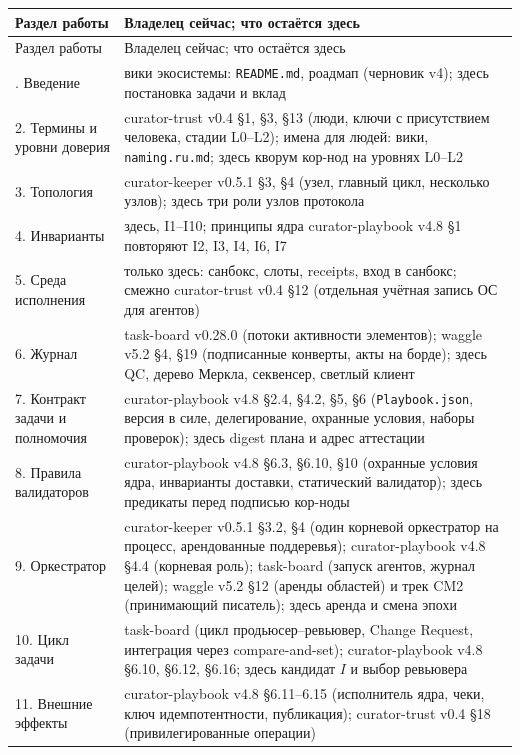 \documentclass[11pt,a4paper]{article}
\begin{document}
{\footnotesize
\begin{longtable}{p{3.4cm} p{10.0cm}}
\toprule
Раздел работы & Владелец сейчас; что остаётся здесь \\
\midrule
\endfirsthead
\toprule
Раздел работы & Владелец сейчас; что остаётся здесь \\
\midrule
\endhead
\bottomrule
\endfoot
\bottomrule
\endlastfoot
1. Введение & вики экосистемы: \texttt{README.md}, роадмап (черновик v4); здесь постановка задачи и вклад \\
2. Термины и уровни доверия & curator-trust v0.4 §1, §3, §13 (люди, ключи с присутствием человека, стадии L0--L2); имена для людей: вики, \texttt{naming.ru.md}; здесь кворум кор-нод на уровнях L0--L2 \\
3. Топология & curator-keeper v0.5.1 §3, §4 (узел, главный цикл, несколько узлов); здесь три роли узлов протокола \\
4. Инварианты & здесь, I1--I10; принципы ядра curator-playbook v4.8 §1 повторяют I2, I3, I4, I6, I7 \\
5. Среда исполнения & только здесь: санбокс, слоты, receipts, вход в санбокс; смежно curator-trust v0.4 §12 (отдельная учётная запись ОС для агентов) \\
6. Журнал & task-board v0.28.0 (потоки активности элементов); waggle v5.2 §4, §19 (подписанные конверты, акты на борде); здесь QC, дерево Меркла, секвенсер, светлый клиент \\
7. Контракт задачи и полномочия & curator-playbook v4.8 §2.4, §4.2, §5, §6 (\texttt{Playbook.json}, версия в силе, делегирование, охранные условия, наборы проверок); здесь digest плана и адрес аттестации \\
8. Правила валидаторов & curator-playbook v4.8 §6.3, §6.10, §10 (охранные условия ядра, инварианты доставки, статический валидатор); здесь предикаты перед подписью кор-ноды \\
9. Оркестратор & curator-keeper v0.5.1 §3.2, §4 (один корневой оркестратор на процесс, арендованные поддеревья); curator-playbook v4.8 §4.4 (корневая роль); task-board (запуск агентов, журнал целей); waggle v5.2 §12 (аренды областей) и трек CM2 (принимающий писатель); здесь аренда и смена эпохи \\
10. Цикл задачи & task-board (цикл продьюсер--ревьювер, Change Request, интеграция через compare-and-set); curator-playbook v4.8 §6.10, §6.12, §6.16; здесь кандидат $I$ и выбор ревьювера \\
11. Внешние эффекты & curator-playbook v4.8 §6.11--6.15 (исполнитель ядра, чеки, ключ идемпотентности, публикация); curator-trust v0.4 §18 (привилегированные операции) \\

\end{longtable}}
\end{document}
